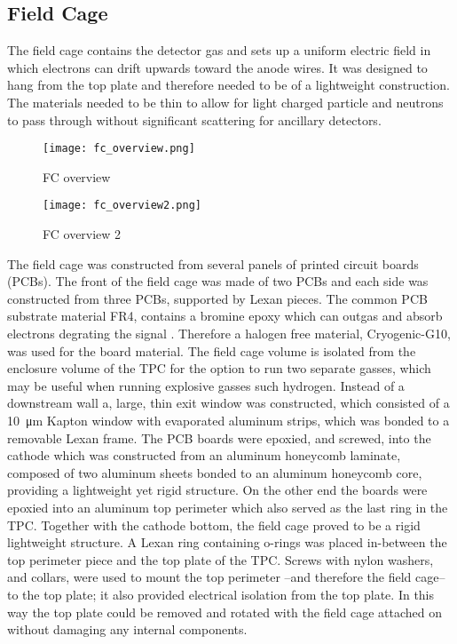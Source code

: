 \subsection{Field Cage}

The field cage contains the detector gas and sets up a uniform electric field in which electrons can drift upwards toward the anode wires. It was designed to hang from the top plate and therefore needed to be of a lightweight construction. The materials needed to be thin to allow for light charged particle and neutrons to pass through without significant scattering for ancillary detectors. 

\begin{figure}[!htb]
\texttt{[image: fc\_overview.png]}
\label{fig:fc_overview}
\caption{FC overview}
\end{figure}


\begin{figure}[!htb]
\texttt{[image: fc\_overview2.png]}
\label{fig:fc_overview2}
\caption{FC overview 2}
\end{figure}

The field cage was constructed from several panels of printed circuit boards (PCBs). The front of the field cage was made of two PCBs and each side was constructed from three PCBs, supported by Lexan pieces. The common PCB substrate material FR4, contains a bromine epoxy which can outgas and absorb electrons degrating the signal \cite{tpcAging}. Therefore a halogen free material, Cryogenic-G10, was used for the board material. The field cage volume is isolated from the enclosure volume of the TPC for the option to run two separate  gasses, which may be useful when running explosive gasses such hydrogen. Instead of a downstream wall a, large, thin exit window was constructed, which consisted of a  \SI{10}{\micro\metre} Kapton window with evaporated aluminum strips, which was bonded to a removable Lexan frame. The PCB boards were epoxied, and screwed, into the cathode which was constructed from an aluminum honeycomb laminate, composed of two aluminum sheets bonded to an aluminum honeycomb core, providing a lightweight yet rigid structure. On the other end the boards were epoxied into an aluminum top perimeter which also served as the last ring in the TPC. Together with the cathode bottom, the field cage proved to be a rigid lightweight structure. A Lexan ring containing o-rings was placed in-between the top perimeter piece and the top plate of the TPC. Screws with nylon washers, and collars, were used to mount the top perimeter --and therefore the field cage-- to the top plate; it also provided electrical isolation from the top plate. In this way the top plate could be removed and rotated with the field cage attached on without damaging any internal components. 

